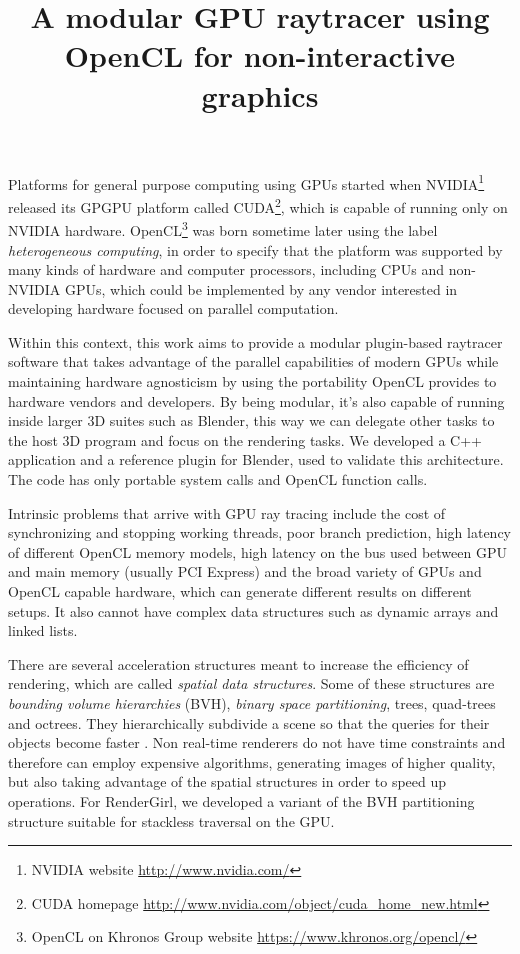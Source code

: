 \documentclass{vgtc}
\title{A modular GPU raytracer using OpenCL for non-interactive graphics}
\begin{document}

\maketitle

Platforms for general purpose computing using GPUs started when
NVIDIA\footnote{NVIDIA website \url{http://www.nvidia.com/}} released
its GPGPU platform called CUDA\footnote{CUDA homepage
 \url{http://www.nvidia.com/object/cuda_home_new.html}}, which is
capable of running only on NVIDIA hardware. OpenCL\footnote{OpenCL on
 Khronos Group website \url{https://www.khronos.org/opencl/}} was
born sometime later using the label \emph{heterogeneous computing}, in
order to specify that the platform was supported by many kinds of
hardware and computer processors, including CPUs and non-NVIDIA GPUs,
which could be implemented by any vendor interested in developing
hardware focused on parallel computation.

Within this context, this work aims to provide a modular plugin-based
raytracer software that takes advantage of the parallel capabilities
of modern GPUs while maintaining hardware agnosticism by using the
portability OpenCL provides to hardware vendors and developers. By
being modular, it's also capable of running inside larger 3D suites
such as Blender, this way we can delegate other tasks to the host 3D
program and focus on the rendering tasks. We developed a C++
application and a reference plugin for Blender, used to validate this
architecture. The code has only portable system calls and OpenCL
function calls.

Intrinsic problems that arrive with GPU ray tracing include the cost
of synchronizing and stopping working threads, poor branch prediction,
high latency of different OpenCL memory models, high latency on the
bus used between GPU and main memory (usually PCI Express) and the
broad variety of GPUs and OpenCL capable hardware, which can generate
different results on different setups. It also cannot have complex data
structures such as dynamic arrays and linked lists.

There are several acceleration structures meant to increase the efficiency
of rendering, which are called \emph{spatial data structures}. Some of
these structures are \emph{bounding volume hierarchies} (BVH),
\emph{binary space partitioning}, trees, quad-trees and octrees. They
hierarchically subdivide a scene so that the queries for their objects
become faster \cite[Chapter~14.1]{akenine-moller:2008}. Non real-time
renderers do not have time constraints and therefore can employ
expensive algorithms, generating images of higher quality, but also
taking advantage of the spatial structures in order to speed up
operations. For RenderGirl, we developed a variant of the BVH
partitioning structure suitable for stackless traversal on the GPU.
\end{document}
